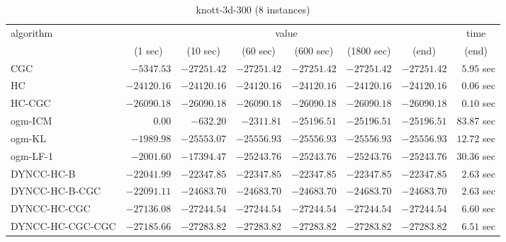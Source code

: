 \begin{table}[H]
\scriptsize
\centering
\caption{knott-3d-300 (8 instances)}
\label{tab:anytimetable-knott-3d-300}
\begin{tabular}{lrrrrrrr}
\toprule
           algorithm &                                   \multicolumn{6}{c}{value} & \multicolumn{1}{c}{time}   \\  
\cmidrule(lr){2-7}\cmidrule(lr){8-8}  
                     & \multicolumn{1}{c}{(1 sec)} & \multicolumn{1}{c}{(10 sec)} & \multicolumn{1}{c}{(60 sec)} & \multicolumn{1}{c}{(600 sec)} & \multicolumn{1}{c}{(1800 sec)} & \multicolumn{1}{c}{(end)} & \multicolumn{1}{c}{(end)}   \\ \midrule 
                 CGC & $     -5347.53$ & $    -27251.42$ & $    -27251.42$ & $    -27251.42$ & $    -27251.42$ & $    -27251.42$ & $         5.95$ sec   \\ 
                  HC & $    -24120.16$ & $    -24120.16$ & $    -24120.16$ & $    -24120.16$ & $    -24120.16$ & $    -24120.16$ & $         0.06$ sec   \\ 
              HC-CGC & $    -26090.18$ & $    -26090.18$ & $    -26090.18$ & $    -26090.18$ & $    -26090.18$ & $    -26090.18$ & $         0.10$ sec   \\ 
             ogm-ICM & $         0.00$ & $      -632.20$ & $     -2311.81$ & $    -25196.51$ & $    -25196.51$ & $    -25196.51$ & $        83.87$ sec   \\ 
              ogm-KL & $     -1989.98$ & $    -25553.07$ & $    -25556.93$ & $    -25556.93$ & $    -25556.93$ & $    -25556.93$ & $        12.72$ sec   \\ 
            ogm-LF-1 & $     -2001.60$ & $    -17394.47$ & $    -25243.76$ & $    -25243.76$ & $    -25243.76$ & $    -25243.76$ & $        30.36$ sec   \\ 
          DYNCC-HC-B & $    -22041.99$ & $    -22347.85$ & $    -22347.85$ & $    -22347.85$ & $    -22347.85$ & $    -22347.85$ & $         2.63$ sec   \\ 
      DYNCC-HC-B-CGC & $    -22091.11$ & $    -24683.70$ & $    -24683.70$ & $    -24683.70$ & $    -24683.70$ & $    -24683.70$ & $         2.63$ sec   \\ 
        DYNCC-HC-CGC & $    -27136.08$ & $    -27244.54$ & $    -27244.54$ & $    -27244.54$ & $    -27244.54$ & $    -27244.54$ & $         6.60$ sec   \\ 
    DYNCC-HC-CGC-CGC & $    -27185.66$ & $    -27283.82$ & $    -27283.82$ & $    -27283.82$ & $    -27283.82$ & $    -27283.82$ & $         6.51$ sec   \\ 

\end{tabular}
\end{table}
